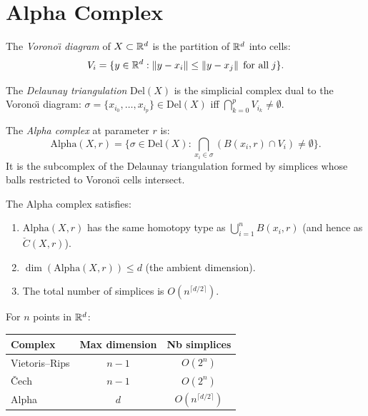 \section{Alpha Complex}

\begin{definition}
The \emph{Vorono\"{\i} diagram} of $X \subset \mathbb{R}^d$ is the partition
of $\mathbb{R}^d$ into cells:
\[
  V_i = \{y \in \mathbb{R}^d : \left\| y - x_i \right\| \leq \left\| y - x_j \right\|
  \;\text{for all}\; j\}.
\]
\end{definition}

\begin{definition}
The \emph{Delaunay triangulation} $\mathrm{Del}(X)$ is the simplicial
complex dual to the Vorono\"{\i} diagram:
$\sigma = \{x_{i_0}, \ldots, x_{i_p}\} \in \mathrm{Del}(X)$ iff
$\bigcap_{k=0}^p V_{i_k} \neq \emptyset$.
\end{definition}

\begin{definition}
The \emph{Alpha complex} at parameter $r$ is:
\[
  \mathrm{Alpha}(X, r) = \big\{
    \sigma \in \mathrm{Del}(X) :
    \bigcap_{x_i \in \sigma} (B(x_i, r) \cap V_i) \neq \emptyset
  \big\}.
\]
It is the subcomplex of the Delaunay triangulation formed by simplices
whose balls restricted to Vorono\"{\i} cells intersect.
\end{definition}

\begin{theorem}[Edelsbrunner, 1995]
The Alpha complex satisfies:
\begin{enumerate}
  \item $\mathrm{Alpha}(X, r)$ has the same homotopy type as
        $\bigcup_{i=1}^n B(x_i, r)$ (and hence as $\check{C}(X, r)$).
  \item $\dim(\mathrm{Alpha}(X, r)) \leq d$ (the ambient dimension).
  \item The total number of simplices is $O(n^{\lceil d/2 \rceil})$.
\end{enumerate}
\end{theorem}

\begin{keyformulas}[title=\textbf{Size Comparison}]
For $n$ points in $\mathbb{R}^d$:
\begin{center}
\begin{tabular}{lcc}
\toprule
\textbf{Complex} & \textbf{Max dimension} & \textbf{Nb simplices} \\
\midrule
Vietoris--Rips & $n - 1$ & $O(2^n)$ \\
\v{C}ech & $n - 1$ & $O(2^n)$ \\
Alpha & $d$ & $O(n^{\lceil d/2 \rceil})$ \\
\bottomrule
\end{tabular}
\end{center}
\end{keyformulas}

